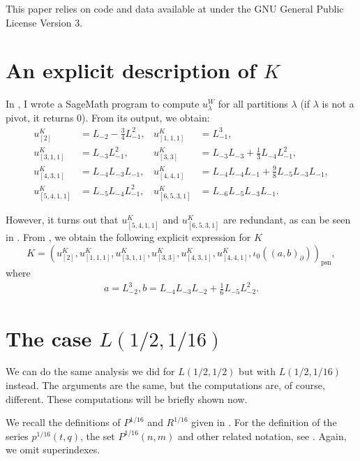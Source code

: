 \documentclass[a4paper, 12pt, reqno]{amsart}
\theoremstyle{remark}
\DeclareMathOperator{\psn}{psn}
\begin{document}
This paper relies on code and data available at \cite{sagemath2} under the GNU General Public License Version 3.

\appendix
\section{An explicit description of $K$}
\label{sec:an-expl-descr}

In \cite[ising-modules.ipynb]{sagemath2}, I wrote a SageMath program to compute $u^W_{\lambda}$ for all partitions $\lambda$ (if $\lambda$ is not a pivot, it returns $0$).
From its output, we obtain:
\begin{align*}
  u^K_{[2]} &= L_{-2} - \tfrac{3}{4}L_{-1}^2, &u^K_{[1, 1, 1]} &= L_{-1}^3, \\
  u^K_{[3, 1, 1]} &= L_{-3}L_{-1}^2, &u^K_{[3, 3]} &= L_{-3}L_{-3} + \tfrac{1}{3}L_{-4}L_{-1}^2, \\
  u^K_{[4, 3, 1]} &= L_{-4}L_{-3}L_{-1}, &u^K_{[4, 4, 1]} &= L_{-4}L_{-4}L_{-1} + \tfrac{9}{8}L_{-5}L_{-3}L_{-1}, \\
  u^K_{[5, 4, 1, 1]} &= L_{-5}L_{-4}L_{-1}^2, &u^K_{[6, 5, 3, 1]} &= L_{-6}L_{-5}L_{-3}L_{-1}.
\end{align*}

However, it turns out that $u^K_{[5, 4, 1, 1]}$ and $u^K_{[6, 5, 3, 1]}$ are redundant, as can be seen in \cite[m11-m15.ipynb]{sagemath2}.
From \cite[Theorem 2]{andrews_singular_2022}, we obtain the following explicit expression for $K$
\begin{equation*}
  K = (u^K_{[2]}, u^K_{[1, 1, 1]}, u^K_{[3, 1, 1]}, u^K_{[3, 3]}, u^K_{[4, 3, 1]}, u^K_{[4, 4, 1]}, \iota_0((a, b)_{\partial}))_{\psn},
\end{equation*}
where
\begin{align*}
  a = L_{-2}^3, b = L_{-4}L_{-3}L_{-2} + \tfrac{1}{6}L_{-5}L_{-2}^2.
\end{align*}

\section{The case $L(1/2, 1/16)$}
\label{sec:case-l12-116}

We can do the same analysis we did for $L(1/2, 1/2)$ but with $L(1/2, 1/16)$ instead.
The arguments are the same, but the computations are, of course, different.
These computations will be briefly shown now.

We recall the definitions of $P^{1/16}$ and $R^{1/16}$ given in .
For the definition of the series $p^{1/16}(t, q)$, the set $P^{1/16}(n, m)$ and other related notation, see .
Again, we omit superindexes.
\end{document}
